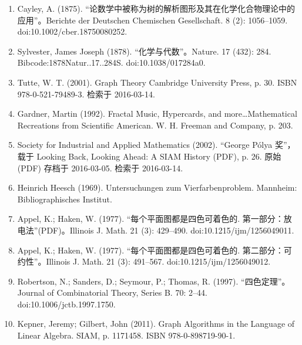 \begin{enumerate}
\item  Cayley, A. (1875). “论数学中被称为树的解析图形及其在化学化合物理论中的应用”。Berichte der Deutschen Chemischen Gesellschaft. 8 (2): 1056–1059. doi:10.1002/cber.18750080252.
\item Sylvester, James Joseph (1878). “化学与代数”。Nature. 17 (432): 284. Bibcode:1878Natur..17..284S. doi:10.1038/017284a0.
\item Tutte, W. T. (2001). Graph Theory Cambridge University Press, p. 30. ISBN 978-0-521-79489-3. 检索于 2016-03-14.
\item Gardner, Martin (1992). Fractal Music, Hypercards, and more…Mathematical Recreations from Scientific American. W. H. Freeman and Company, p. 203.
\item Society for Industrial and Applied Mathematics (2002). “George Pólya 奖”，载于 Looking Back, Looking Ahead: A SIAM History (PDF), p. 26. 原始 (PDF) 存档于 2016-03-05. 检索于 2016-03-14.
\item Heinrich Heesch (1969). Untersuchungen zum Vierfarbenproblem. Mannheim: Bibliographisches Institut.
\item Appel, K.; Haken, W. (1977). “每个平面图都是四色可着色的. 第一部分：放电法”(PDF)。Illinois J. Math. 21 (3): 429–490. doi:10.1215/ijm/1256049011.
\item Appel, K.; Haken, W. (1977). “每个平面图都是四色可着色的. 第二部分：可约性”。Illinois J. Math. 21 (3): 491–567. doi:10.1215/ijm/1256049012.
\item Robertson, N.; Sanders, D.; Seymour, P.; Thomas, R. (1997). “四色定理”。Journal of Combinatorial Theory, Series B. 70: 2–44. doi:10.1006/jctb.1997.1750.
\item Kepner, Jeremy; Gilbert, John (2011). Graph Algorithms in the Language of Linear Algebra. SIAM, p. 1171458. ISBN 978-0-898719-90-1.

\end{enumerate}